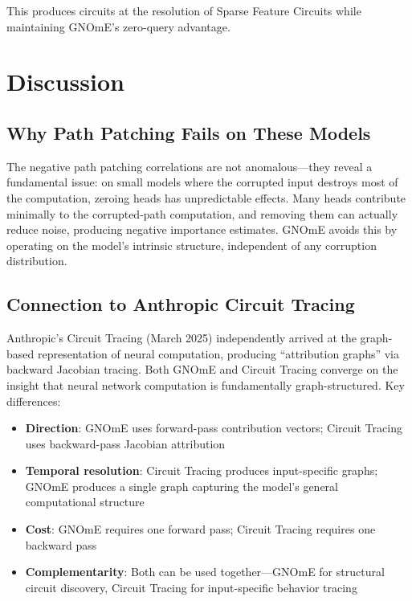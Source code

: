 \documentclass[11pt,a4paper]{article}
\begin{document}
This produces circuits at the resolution of Sparse Feature Circuits \cite{marks2024sparse} while maintaining GNOmE's zero-query advantage.

\section{Discussion}

\subsection{Why Path Patching Fails on These Models}

The negative path patching correlations are not anomalous---they reveal a fundamental issue: on small models where the corrupted input destroys most of the computation, zeroing heads has unpredictable effects. Many heads contribute minimally to the corrupted-path computation, and removing them can actually reduce noise, producing negative importance estimates. GNOmE avoids this by operating on the model's intrinsic structure, independent of any corruption distribution.

\subsection{Connection to Anthropic Circuit Tracing}

Anthropic's Circuit Tracing \cite{anthropic2025circuit} (March 2025) independently arrived at the graph-based representation of neural computation, producing ``attribution graphs'' via backward Jacobian tracing. Both GNOmE and Circuit Tracing converge on the insight that neural network computation is fundamentally graph-structured. Key differences:

\begin{itemize}[leftmargin=*]
    \item \textbf{Direction}: GNOmE uses forward-pass contribution vectors; Circuit Tracing uses backward-pass Jacobian attribution
    \item \textbf{Temporal resolution}: Circuit Tracing produces input-specific graphs; GNOmE produces a single graph capturing the model's general computational structure
    \item \textbf{Cost}: GNOmE requires one forward pass; Circuit Tracing requires one backward pass
    \item \textbf{Complementarity}: Both can be used together---GNOmE for structural circuit discovery, Circuit Tracing for input-specific behavior tracing
\end{itemize}
\end{document}
